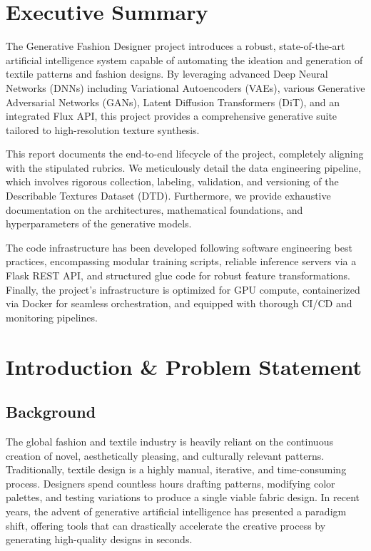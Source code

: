 \documentclass[12pt,a4paper]{article}
\begin{document}
\section{Executive Summary}

The Generative Fashion Designer project introduces a robust, state-of-the-art artificial intelligence system capable of automating the ideation and generation of textile patterns and fashion designs. By leveraging advanced Deep Neural Networks (DNNs) including Variational Autoencoders (VAEs), various Generative Adversarial Networks (GANs), Latent Diffusion Transformers (DiT), and an integrated Flux API, this project provides a comprehensive generative suite tailored to high-resolution texture synthesis.

This report documents the end-to-end lifecycle of the project, completely aligning with the stipulated rubrics. We meticulously detail the data engineering pipeline, which involves rigorous collection, labeling, validation, and versioning of the Describable Textures Dataset (DTD). Furthermore, we provide exhaustive documentation on the architectures, mathematical foundations, and hyperparameters of the generative models.

The code infrastructure has been developed following software engineering best practices, encompassing modular training scripts, reliable inference servers via a Flask REST API, and structured glue code for robust feature transformations. Finally, the project’s infrastructure is optimized for GPU compute, containerized via Docker for seamless orchestration, and equipped with thorough CI/CD and monitoring pipelines.

\section{Introduction \& Problem Statement}

\subsection{Background}
The global fashion and textile industry is heavily reliant on the continuous creation of novel, aesthetically pleasing, and culturally relevant patterns. Traditionally, textile design is a highly manual, iterative, and time-consuming process. Designers spend countless hours drafting patterns, modifying color palettes, and testing variations to produce a single viable fabric design. In recent years, the advent of generative artificial intelligence has presented a paradigm shift, offering tools that can drastically accelerate the creative process by generating high-quality designs in seconds.
\end{document}
